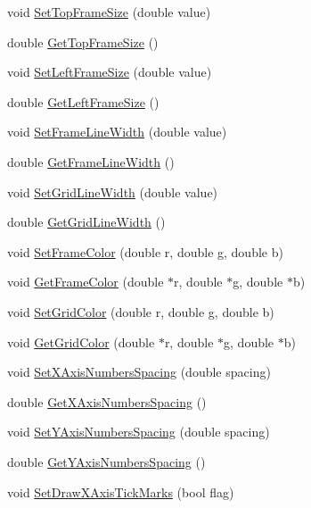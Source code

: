 \begin{DoxyCompactItemize}
\item 
void \hyperlink{class_c_plot2_d_a36f6261f95c73030c1a6b8eeb014d39c}{Set\-Top\-Frame\-Size} (double value)
\item 
double \hyperlink{class_c_plot2_d_a10221e9b470fc6229658b1e00ca131ab}{Get\-Top\-Frame\-Size} ()
\item 
void \hyperlink{class_c_plot2_d_a8ef2cc4b225d443cb69be9fd2e5a29f1}{Set\-Left\-Frame\-Size} (double value)
\item 
double \hyperlink{class_c_plot2_d_af856d9c2a78c3ec673c3e678113a72ef}{Get\-Left\-Frame\-Size} ()
\item 
void \hyperlink{class_c_plot2_d_ae85a64c11188bf5c1e0bafebfb11d10a}{Set\-Frame\-Line\-Width} (double value)
\item 
double \hyperlink{class_c_plot2_d_ae6c489fcc42b0e7b0b81571c6e66400f}{Get\-Frame\-Line\-Width} ()
\item 
void \hyperlink{class_c_plot2_d_a0b5c4d875461fffd7354bc9490e0754e}{Set\-Grid\-Line\-Width} (double value)
\item 
double \hyperlink{class_c_plot2_d_af607e0381c128b4be65f29a8d220ff39}{Get\-Grid\-Line\-Width} ()
\item 
void \hyperlink{class_c_plot2_d_ae35e966469934b80023b0b2cc2a67fad}{Set\-Frame\-Color} (double r, double g, double b)
\item 
void \hyperlink{class_c_plot2_d_a1693fca6a6f75adddb6de6c827600285}{Get\-Frame\-Color} (double $\ast$r, double $\ast$g, double $\ast$b)
\item 
void \hyperlink{class_c_plot2_d_a196cc8ef3be7b2bb1692dfa3ecb4091c}{Set\-Grid\-Color} (double r, double g, double b)
\item 
void \hyperlink{class_c_plot2_d_a2876f8232c087a18fac95bf1d9b0b94d}{Get\-Grid\-Color} (double $\ast$r, double $\ast$g, double $\ast$b)
\item 
void \hyperlink{class_c_plot2_d_aaba866905d97539af165d7eb62531ff7}{Set\-X\-Axis\-Numbers\-Spacing} (double spacing)
\item 
double \hyperlink{class_c_plot2_d_a9bc57d5e6015dabd830ca7ed6d7336e1}{Get\-X\-Axis\-Numbers\-Spacing} ()
\item 
void \hyperlink{class_c_plot2_d_a552baa979561cf733886ab75c67c0903}{Set\-Y\-Axis\-Numbers\-Spacing} (double spacing)
\item 
double \hyperlink{class_c_plot2_d_a934e6cc842afdff5d3a5d8491b61004f}{Get\-Y\-Axis\-Numbers\-Spacing} ()
\item 
void \hyperlink{class_c_plot2_d_ae13509fe69fbba363c2856b4c880bff5}{Set\-Draw\-X\-Axis\-Tick\-Marks} (bool flag)

\end{DoxyCompactItemize}
